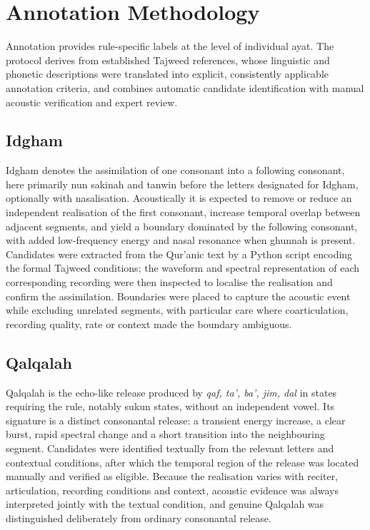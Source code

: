 \documentclass[runningheads]{llncs}
\begin{document}
\section{Annotation Methodology}
\label{sec:annotation}

Annotation provides rule-specific labels at the level of individual ayat. The
protocol derives from established Tajweed references, whose linguistic and
phonetic descriptions were translated into explicit, consistently applicable
annotation criteria, and combines automatic candidate identification with manual
acoustic verification and expert review.

\subsection{Idgham}

Idgham denotes the assimilation of one consonant into a following consonant,
here primarily nun sakinah and tanwin before the letters designated for Idgham,
optionally with nasalisation. Acoustically it is expected to remove or reduce an
independent realisation of the first consonant, increase temporal overlap
between adjacent segments, and yield a boundary dominated by the following
consonant, with added low-frequency energy and nasal resonance when ghunnah is
present. Candidates were extracted from the Qur'anic text by a Python script
encoding the formal Tajweed conditions; the waveform and spectral representation
of each corresponding recording were then inspected to localise the realisation
and confirm the assimilation. Boundaries were placed to capture the acoustic
event while excluding unrelated segments, with particular care where
coarticulation, recording quality, rate or context made the boundary ambiguous.

\subsection{Qalqalah}

Qalqalah is the echo-like release produced by \emph{qaf, ta', ba', jim, dal} in
states requiring the rule, notably sukun states, without an independent vowel.
Its signature is a distinct consonantal release: a transient energy increase, a
clear burst, rapid spectral change and a short transition into the neighbouring
segment. Candidates were identified textually from the relevant letters and
contextual conditions, after which the temporal region of the release was
located manually and verified as eligible. Because the realisation varies with
reciter, articulation, recording conditions and context, acoustic evidence was
always interpreted jointly with the textual condition, and genuine Qalqalah was
distinguished deliberately from ordinary consonantal release.
\end{document}

